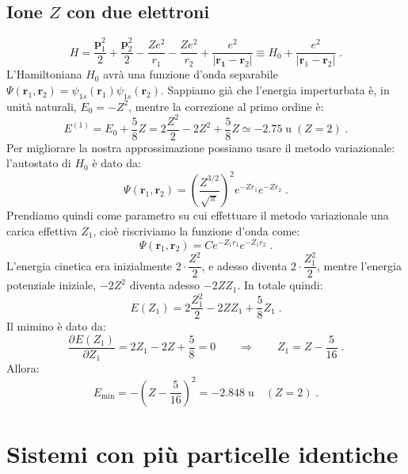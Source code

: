 \documentclass[10pt,a4paper]{report}
\theoremstyle{definition}
\newcommand{\pdev}[3][]{\frac{\partial^{#1} #2}{\partial #3^{#1}}}
\numberwithin{equation}{section}
\begin{document}
\section{Ione $Z$ con due elettroni}
\begin{equation}
H=\frac{\mathbf{p}_1^2}{2}+\frac{\mathbf{p}_2^2}{2}-\frac{Ze^2}{r_1}-\frac{Ze^2}{r_2}+\frac{e^2}{|\mathbf{r_1}-\mathbf{r}_2|}\equiv H_0+\frac{e^2}{|\mathbf{r}_1-\mathbf{r}_2|}\;.
\end{equation}
L'Hamiltoniana $H_0$ avrà una funzione d'onda separabile $\Psi(\mathbf{r}_1,\mathbf{r}_2)=\psi_{1s}(\mathbf{r}_1)\psi_{1s}(\mathbf{r}_2)$. Sappiamo già che l'energia imperturbata è, in unità naturali, $E_0=-Z^2$, mentre la correzione al primo ordine è:
\begin{equation}
E^{(1)}=E_0+\frac{5}{8}Z=2\frac{Z^2}{2}-2Z^2+\frac{5}{8}Z\simeq -2.75\;\mbox{u}\; (Z=2)\;.
\end{equation}
Per migliorare la nostra approssimazione possiamo usare il metodo variazionale: l'autostato di $H_0$ è dato da:
\begin{equation}
\Psi(\mathbf{r}_1,\mathbf{r}_2)=\left(\frac{Z^{3/2}}{\sqrt{\pi}}\right)^2e^{-Zr_1}e^{-Zr_2}\;.
\end{equation}
Prendiamo quindi come parametro su cui effettuare il metodo variazionale una carica effettiva $Z_1$, cioè riscriviamo la funzione d'onda come:
\begin{equation}
\Psi(\mathbf{r}_1,\mathbf{r}_2)=Ce^{-Z_1r_1}e^{-Z_1r_2}\;.
\end{equation}
L'energia cinetica era inizialmente $2\cdot\dfrac{Z^2}{2}$, e adesso diventa $2\cdot\dfrac{Z_1^2}{2}$, mentre l'energia potenziale iniziale, $-2Z^2$ diventa adesso $-2ZZ_1$. In totale quindi:
\begin{equation}
E(Z_1)=2\frac{Z_1^2}{2}-2ZZ_1+\frac{5}{8}Z_1\;.
\end{equation}
Il mimino è dato da:
\begin{equation}
\pdev{E(Z_1)}{Z_1}=2Z_1-2Z+\frac{5}{8}=0\qquad \Longrightarrow\qquad Z_1=Z-\frac{5}{16}\;.
\end{equation}
Allora:
\begin{equation}
E_{\mathrm{min}}=-\left(Z-\frac{5}{16}\right)^2=-2.848\;\mbox{u}\quad (Z=2)\;.
\end{equation}
\chapter{Sistemi con più particelle identiche}
\end{document}
